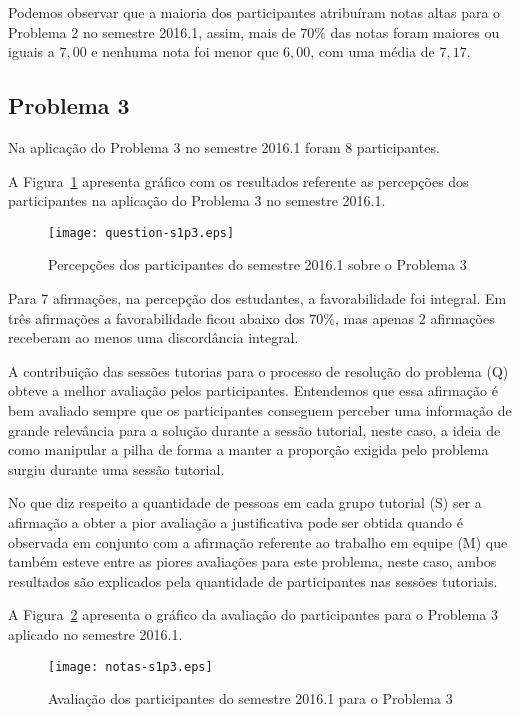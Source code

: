 Podemos observar que a maioria dos participantes atribuíram
notas altas para o Problema 2 no semestre 2016.1, assim, mais de $70\%$ das notas
foram maiores ou iguais a $7,00$ e nenhuma nota foi menor que $6,00$, com uma média
de $7,17$.

\subsection{Problema 3}
Na aplicação do Problema 3 no semestre 2016.1 foram 8 participantes.

A Figura~\ref{percep-s1p3} apresenta gráfico com os resultados referente
as percepções dos participantes na aplicação do
Problema 3 no semestre 2016.1.

\begin{figure}[!htb]
\centering
\texttt{[image: question-s1p3.eps]}
\caption{Percepções dos participantes do semestre 2016.1 sobre o Problema 3}
\label{percep-s1p3}
\end{figure}

Para 7 afirmações, na percepção dos estudantes, a favorabilidade foi integral.
Em três afirmações a favorabilidade ficou abaixo dos $70\%$, mas apenas 2
afirmações receberam ao menos uma discordância integral.

A contribuição das sessões tutorias para o processo
de resolução do problema (Q) obteve a melhor avaliação pelos
participantes.
Entendemos que essa afirmação é bem avaliado sempre que
os participantes conseguem perceber uma informação de
grande relevância para a solução durante a sessão
tutorial, neste caso, a ideia de como manipular a pilha
de forma a manter a proporção exigida pelo problema
surgiu durante uma sessão tutorial.

No que diz respeito a quantidade de pessoas em
cada grupo tutorial (S) ser a afirmação a obter a pior
avaliação a justificativa pode ser obtida quando
é observada em conjunto com a afirmação referente ao
trabalho em equipe (M) que também esteve entre
as piores avaliações para este problema, neste caso,
ambos resultados são explicados pela quantidade de
participantes nas sessões tutoriais.

A Figura~\ref{aval-s1p3} apresenta o gráfico da
avaliação do participantes para o Problema 3 aplicado no semestre 2016.1.

\begin{figure}[!htb]
\centering
\texttt{[image: notas-s1p3.eps]}
\caption{Avaliação dos participantes do semestre 2016.1 para o Problema 3}
\label{aval-s1p3}
\end{figure}


